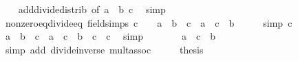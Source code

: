 \begin{isabellebody}
%
\isadelimproof
\ \ %
\endisadelimproof
%
\isatagproof
{}\isamarkupfalse%
\ add{\isacharunderscore}{\kern0pt}divide{\isacharunderscore}{\kern0pt}distrib\ {\isacharbrackleft}{\kern0pt}of\ a\ {\isachardoublequoteopen}{\isacharminus}{\kern0pt}\ b{\isachardoublequoteclose}\ c{\isacharbrackright}{\kern0pt}\ \isamarkupfalse%
\ simp%
\endisatagproof
{\isafoldproof}%
%
\isadelimproof
\isanewline
%
\endisadelimproof
\isanewline
{}\isamarkupfalse%
\ nonzero{\isacharunderscore}{\kern0pt}eq{\isacharunderscore}{\kern0pt}divide{\isacharunderscore}{\kern0pt}eq\ {\isacharbrackleft}{\kern0pt}field{\isacharunderscore}{\kern0pt}simps{\isacharbrackright}{\kern0pt}{\isacharcolon}{\kern0pt}\ {\isachardoublequoteopen}c\ {\isasymnoteq}\ {}\ {\isasymLongrightarrow}\ a\ {\isacharequal}{\kern0pt}\ b\ {\isacharslash}{\kern0pt}\ c\ {\isasymlongleftrightarrow}\ a\ {\isacharasterisk}{\kern0pt}\ c\ {\isacharequal}{\kern0pt}\ b{\isachardoublequoteclose}\isanewline
%
\isadelimproof
%
\endisadelimproof
%
\isatagproof
{}\isamarkupfalse%
\ {\isacharminus}{\kern0pt}\isanewline
\ \ \isamarkupfalse%
\ {\isacharbrackleft}{\kern0pt}simp{\isacharbrackright}{\kern0pt}{\isacharcolon}{\kern0pt}\ {\isachardoublequoteopen}c\ {\isasymnoteq}\ {}{\isachardoublequoteclose}\isanewline
\ \ \isamarkupfalse%
\ {\isachardoublequoteopen}a\ {\isacharequal}{\kern0pt}\ b\ {\isacharslash}{\kern0pt}\ c\ {\isasymlongleftrightarrow}\ a\ {\isacharasterisk}{\kern0pt}\ c\ {\isacharequal}{\kern0pt}\ {\isacharparenleft}{\kern0pt}b\ {\isacharslash}{\kern0pt}\ c{\isacharparenright}{\kern0pt}\ {\isacharasterisk}{\kern0pt}\ c{\isachardoublequoteclose}\ \isamarkupfalse%
\ simp\isanewline
\ \ \isamarkupfalse%
\ \isamarkupfalse%
\ {\isachardoublequoteopen}{\isachardot}{\kern0pt}{\isachardot}{\kern0pt}{\isachardot}{\kern0pt}\ {\isasymlongleftrightarrow}\ a\ {\isacharasterisk}{\kern0pt}\ c\ {\isacharequal}{\kern0pt}\ b{\isachardoublequoteclose}\ \isamarkupfalse%
\ {\isacharparenleft}{\kern0pt}simp\ add{\isacharcolon}{\kern0pt}\ divide{\isacharunderscore}{\kern0pt}inverse\ mult{\isachardot}{\kern0pt}assoc{\isacharparenright}{\kern0pt}\isanewline
\ \ \isamarkupfalse%
\ \isamarkupfalse%
\ {\isacharquery}{\kern0pt}thesis\ \isacommand{{\isachardot}{\kern0pt}}\isamarkupfalse%
\isanewline
{}\isamarkupfalse%
%
\endisatagproof
{\isafoldproof}%
%
\isadelimproof
\isanewline
%
\endisadelimproof
\isanewline
{}\isamarkupfalse%

\end{isabellebody}
